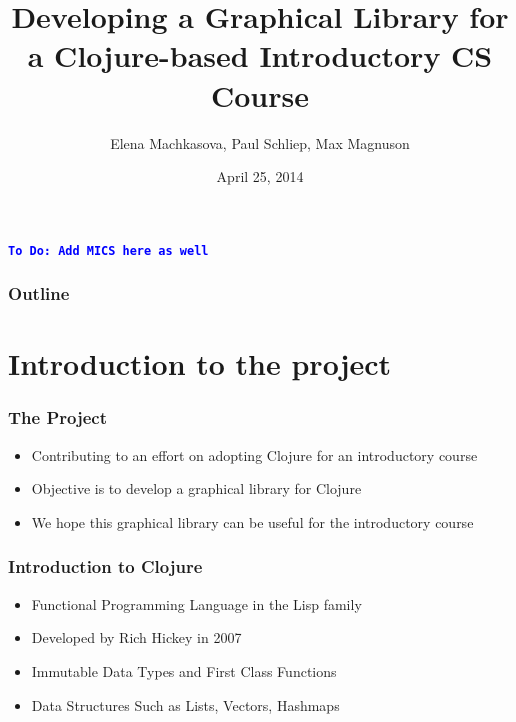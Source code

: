 \documentclass{beamer}
\newcommand{\comment}[1]{{\bf \tt  {#1}}}
\newcommand{\todo}[1]{\textcolor{blue}{\comment{To Do: {#1}}}}
\begin{document}
\title{Developing a Graphical Library for a Clojure-based Introductory CS Course}
\author{Elena Machkasova, Paul Schliep, Max Magnuson}
\date{April 25, 2014}

\begin{frame}
  \titlepage
  \todo{Add MICS here as well}
\end{frame}

\begin{frame}

  \frametitle{Outline}
\tableofcontents

\end{frame}

\section{Introduction to the project}

\begin{frame}
\frametitle{The Project}
\begin{itemize}
\item Contributing to an effort on adopting Clojure for an introductory course
\item Objective is to develop a graphical library for Clojure
\item We hope this graphical library can be useful for the introductory course
\end{itemize}
\end{frame}

\begin{frame}
\frametitle{Introduction to Clojure}
\begin{itemize}
\item Functional Programming Language in the Lisp family
\item Developed by Rich Hickey in 2007
\item Immutable Data Types and First Class Functions
\item Data Structures Such as Lists, Vectors, Hashmaps
\end{itemize}
\end{frame}
\end{document}

